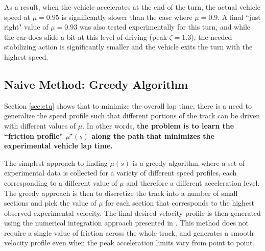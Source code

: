 \documentclass[9pt,shortpaper,twoside,web]{ieeecolor}
\newcommand*\circled[1]{\tikz[baseline=(char.base)]{
            \node[shape=circle,draw,inner sep=2pt] (char) {#1};}}
\begin{document}
As a result,
when the vehicle accelerates at the end of the turn, the actual vehicle speed at $\mu = 0.95$ is significantly slower than the case where $\mu = 0.9$.
A final ``just right" value of $\mu = 0.93$ was also tested experimentally for this turn, and while the car does slide a bit at this level of driving (peak $\zeta = 1.3$),
the needed stabilizing action is significantly smaller and the vehicle exits the turn with the highest speed. 




\subsection{Naive Method: Greedy Algorithm}
\label{sec:greedy}

Section \ref{sec:etu} shows that to  minimize the overall lap time, there is a need to generalize the speed profile such that different portions of the track can be driven with different
values of $\mu$. In other words, \textbf{the problem is to learn the ``friction profile" $\mu^\star(s)$ along the path that minimizes the experimental vehicle lap time.} 

The simplest approach to finding $\mu(s)$ is a greedy algorithm where a set of experimental data is collected for a variety of different speed profiles, each corresponding to a different value of $\mu$ and therefore a different acceleration level. The greedy approach is then to discretize the track into a number of small sections and pick the value of $\mu$ for each section that corresponds to the highest observed experimental velocity.
The final desired velocity profile is then generated using the numerical integration approach presented in \cite{subosits2015autonomous}. This method does not require a single 
value of friction across the whole track, and generates a smooth velocity profile even when the peak acceleration limits vary from point to point. 
\end{document}
